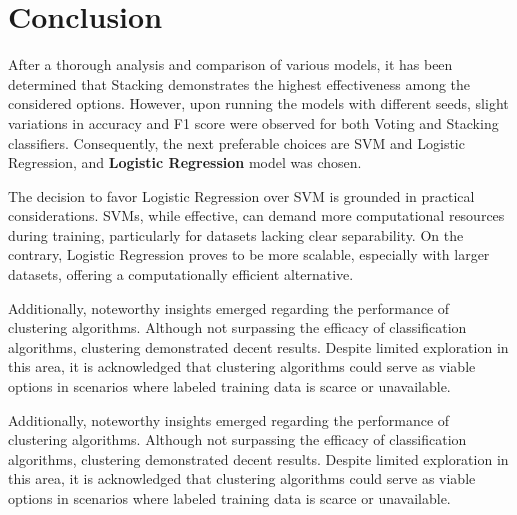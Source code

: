 \documentclass{article}
\begin{document}
\section{Conclusion}


After a thorough analysis and comparison of various models, it has been determined that Stacking demonstrates the highest effectiveness among the considered options. However, upon running the models with different seeds, slight variations in accuracy and F1 score were observed for both Voting and Stacking classifiers. Consequently, the next preferable choices are SVM and Logistic Regression, and \textbf{Logistic Regression} model was chosen.

The decision to favor Logistic Regression over SVM is grounded in practical considerations. SVMs, while effective, can demand more computational resources during training, particularly for datasets lacking clear separability. On the contrary, Logistic Regression proves to be more scalable, especially with larger datasets, offering a computationally efficient alternative.

Additionally, noteworthy insights emerged regarding the performance of clustering algorithms. Although not surpassing the efficacy of classification algorithms, clustering demonstrated decent results. Despite limited exploration in this area, it is acknowledged that clustering algorithms could serve as viable options in scenarios where labeled training data is scarce or unavailable.

Additionally, noteworthy insights emerged regarding the performance of clustering algorithms. Although not surpassing the efficacy of classification algorithms, clustering demonstrated decent results. Despite limited exploration in this area, it is acknowledged that clustering algorithms could serve as viable options in scenarios where labeled training data is scarce or unavailable.  
\end{document}
